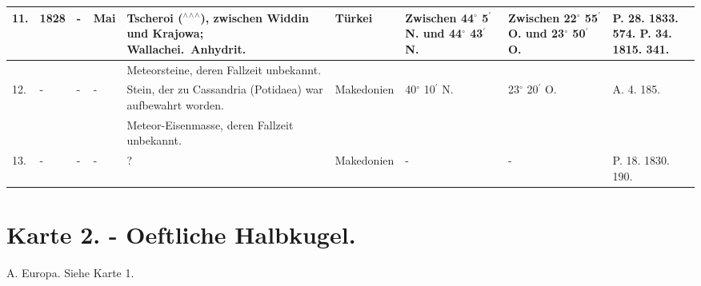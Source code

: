 \documentclass[a4paper, 11pt, oneside, polutonikogreek, german]{article}
\begin{document}
\begin{table}[!ht]
\begin{tabular}{|l|l|l|l|l|l|l|l|l|}
        11. & 1828 & - & Mai & Tscheroi ($^\wedge$$^\wedge$$^\wedge$), zwischen Widdin und Krajowa; Wallachei. Anhydrit. & Türkei & Zwischen 44$^\circ$ 5$^\prime$ N. und 44$^\circ$ 43$^\prime$ N. & Zwischen 22$^\circ$ 55$^\prime$ O. und 23$^\circ$ 50$^\prime$ O. & P. 28. 1833. 574. P. 34. 1815. 341. \\ \hline
          &   &   &   & Meteorsteine, deren Fallzeit unbekannt. &   &   &   &   \\ \hline
        12. & - & - & - & Stein, der zu Cassandria (Potidaea) war aufbewahrt worden. & Makedonien & 40$^\circ$ 10$^\prime$ N. & 23$^\circ$ 20$^\prime$ O. & A. 4. 185. \\ \hline
          &   &   &   & Meteor-Eisenmasse, deren Fallzeit unbekannt. &   &   &   &   \\ \hline
        13. & - & - & - & ? & Makedonien & - & - & P. 18. 1830. 190. \\ \hline
    \end{tabular}
\end{table}
\clearpage
\section{Karte 2. - Oeftliche Halbkugel.}
A. Europa. Siehe Karte 1.
\end{document}
